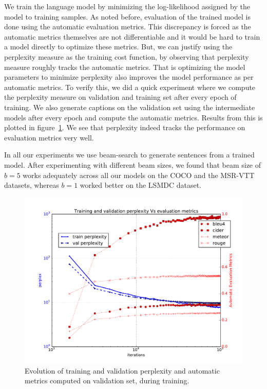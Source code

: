 We train the language model by minimizing the log-likelihood assigned by the
model to training samples.
As noted before, evaluation of the trained model is done using the automatic
evaluation metrics.
This discrepancy is forced as the automatic metrics themselves are not
differentiable and it would be hard to train a model directly to optimize these
metrics.
But, we can justify using the perplexity measure as the training cost function,
by observing that perplexity measure roughly tracks the automatic metrics.
That is optimizing the model parameters to minimize perplexity also improves the
model performance as per automatic metrics.
To verify this, we did a quick experiment where we compute the perplexity
measure on validation and training set after every epoch of training.
We also generate captions on the validation set using the intermediate models
after every epoch and compute the automatic metrics.
Results from this is plotted in figure~\ref{fig:MetVsPerplex}.
We see that perplexity indeed tracks the performance on evaluation metrics very
well.

In all our experiments we use beam-search to generate sentences from a trained
model.
After experimenting with different beam sizes, we found that beam size of $b=5$
works adequately across all our models on the COCO and the MSR-VTT datasets, whereas
$b=1$ worked better on the LSMDC dataset.

\begin{figure}[ht]
\begin{center}
  \includegraphics[width=0.7\linewidth]{images/MetVsPerplex.pdf}
\end{center}
\vspace*{-10mm}
\caption{Evolution of training and validation perplexity and automatic metrics
        computed on validation set, during training.}
\label{fig:MetVsPerplex}
\end{figure}
